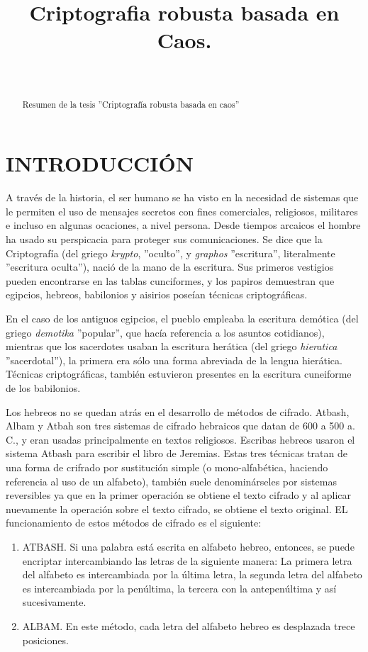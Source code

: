 \documentclass[10pt]{IEEEtran}
\title {Criptografia robusta basada en Caos.}
\author{\IEEEauthorblockN{Marcos Daniel Calderón Calderón}\\
\IEEEauthorblockA{Maestría en Ciencias de la Computación\\
Centro de Investigación en Matemáticas (CIMAT)\\
Guanajuato , Gto.\\
marcos.calderon@cimat.mx}}
\begin{document}
\maketitle
\begin{abstract}
Resumen de la tesis ''Criptografía robusta basada en caos''
\end{abstract}
\section{INTRODUCCIÓN}
A través de la historia, el ser humano se ha visto en la necesidad de sistemas que le permiten el uso de mensajes secretos con fines comerciales, religiosos, militares e incluso en algunas ocaciones, a nivel persona. Desde tiempos arcaicos el hombre ha usado su perspicacia para proteger sus comunicaciones. Se dice que la Criptografía (del griego \textit{krypto}, ''oculto'', y \textit{graphos} ''escritura'', literalmente ''escritura oculta''), nació de la mano de la escritura. Sus primeros vestigios pueden encontrarse en las tablas cunciformes, y los papiros demuestran que egipcios, hebreos, babilonios y aisirios poseían técnicas criptográficas. 

En el caso de los antiguos egipcios, el pueblo empleaba la escritura demótica (del griego \textit{demotika} ''popular'', que hacía referencia a los asuntos cotidianos), mientras que los sacerdotes usaban la escritura herática (del griego \textit{hieratica} ''sacerdotal''), la primera era sólo una forma abreviada de la lengua hierática. Técnicas criptográficas, también estuvieron presentes en la escritura cuneiforme de los babilonios.

Los hebreos no se quedan atrás en el desarrollo de métodos de cifrado. Atbash, Albam y Atbah son tres sistemas de cifrado hebraicos que datan de 600 a  500 a. C., y eran usadas principalmente en textos religiosos. Escribas hebreos usaron el sistema Atbash para escribir el libro de Jeremias. Estas tres técnicas tratan de una forma de crifrado por sustitución simple (o mono-alfabética, haciendo referencia al uso de un alfabeto), también suele denominárseles por sistemas reversibles ya que en la primer operación se obtiene el texto cifrado y al aplicar nuevamente la operación sobre el texto cifrado, se obtiene el texto original. EL funcionamiento de estos métodos de cifrado es el siguiente:

\begin{enumerate}
\item ATBASH. Si una palabra está escrita en alfabeto hebreo, entonces, se puede encriptar intercambiando las letras de la siguiente manera: La primera letra del alfabeto es intercambiada por la última letra, la segunda letra del alfabeto es intercambiada por la penúltima, la tercera con la antepenúltima y así sucesivamente.
\item ALBAM. En este método, cada letra del alfabeto hebreo es desplazada trece posiciones.
\end{enumerate}
\end{document}
